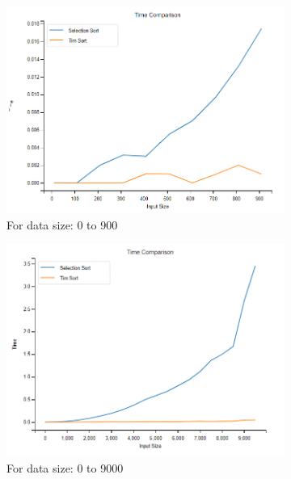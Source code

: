 \documentclass[article,10pt]{article}
\begin{document}
\begin{multicols}{2}
\begin{figure}[t!]
	\centering
	\begin{subfigure}{0.4\textwidth}
		\includegraphics[scale=0.25]{Images/900_time_comp.png}
		\caption{For data size: 0 to 900}
		\label{d900}
	\end{subfigure}
 \hfill
	\begin{subfigure}{0.4\textwidth}
		\includegraphics[scale=0.25]{Images/9k_time_comp.png}
		\caption{For data size: 0 to 9000}
		\label{d9k}
	\end{subfigure}
        \begin{subfigure}{0.4\textwidth}

\end{subfigure}
\end{figure}
\end{multicols}
\end{document}
